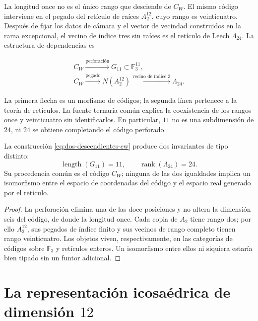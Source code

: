 La longitud once no es el único rango que desciende de \(C_W\). El mismo
código interviene en el pegado del retículo de raíces \(A_2^{12}\), cuyo
rango es veinticuatro. Después de fijar los datos de cámara y el vector de
vecindad construidos en la rama excepcional, el vecino de índice tres sin
raíces es el retículo de Leech \(\Lambda_{24}\). La estructura de
dependencias es

\begin{equation}
\label{eq:dos-descendientes-cw}
\begin{gathered}
C_W\xrightarrow{\text{perforación}}G_{11}\subset\mathbb F_3^{11},\\[2mm]
C_W\xrightarrow{\text{pegado}}N(A_2^{12})
\xrightarrow{\text{vecino de índice }3}\Lambda_{24}.
\end{gathered}
\end{equation}

La primera flecha es un morfismo de códigos; la segunda línea pertenece a la
teoría de retículos. La fuente ternaria común explica la coexistencia de los
rangos once y veinticuatro sin identificarlos. En particular, \(11\) no es
una subdimensión de \(24\), ni \(24\) se obtiene completando el código
perforado.

\begin{proposition}
La construcción \eqref{eq:dos-descendientes-cw} produce dos invariantes de
tipo distinto:
\[
\operatorname{length}(G_{11})=11,
\qquad
\operatorname{rank}(\Lambda_{24})=24.
\]
Su procedencia común es el código \(C_W\); ninguna de las dos igualdades
implica un isomorfismo entre el espacio de coordenadas del código y el
espacio real generado por el retículo.
\end{proposition}

\begin{proof}
La perforación elimina una de las doce posiciones y no altera la dimensión
seis del código, de donde la longitud once. Cada copia de \(A_2\) tiene rango
dos; por ello \(A_2^{12}\), sus pegados de índice finito y sus vecinos de
rango completo tienen rango veinticuatro. Los objetos viven, respectivamente,
en las categorías de códigos sobre \(\mathbb F_3\) y retículos enteros. Un
isomorfismo entre ellos ni siquiera estaría bien tipado sin un funtor
adicional.
\end{proof}

\section{La representación icosaédrica de dimensión \(12\)}
\label{sec:representacion-a5-doce}

